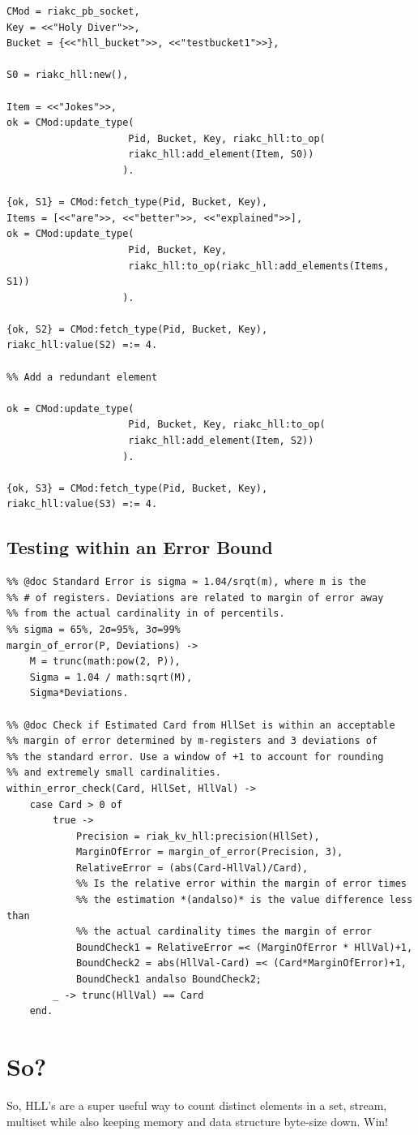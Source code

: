 \documentclass[12pt]{article}
\begin{document}
\begin{lstlisting}
CMod = riakc_pb_socket,
Key = <<"Holy Diver">>,
Bucket = {<<"hll_bucket">>, <<"testbucket1">>},

S0 = riakc_hll:new(),

Item = <<"Jokes">>,
ok = CMod:update_type(
                     Pid, Bucket, Key, riakc_hll:to_op(
                     riakc_hll:add_element(Item, S0))
                    ).

{ok, S1} = CMod:fetch_type(Pid, Bucket, Key),
Items = [<<"are">>, <<"better">>, <<"explained">>],
ok = CMod:update_type(
                     Pid, Bucket, Key,
                     riakc_hll:to_op(riakc_hll:add_elements(Items, S1))
                    ).

{ok, S2} = CMod:fetch_type(Pid, Bucket, Key),
riakc_hll:value(S2) =:= 4.

%% Add a redundant element

ok = CMod:update_type(
                     Pid, Bucket, Key, riakc_hll:to_op(
                     riakc_hll:add_element(Item, S2))
                    ).

{ok, S3} = CMod:fetch_type(Pid, Bucket, Key),
riakc_hll:value(S3) =:= 4.
\end{lstlisting}

\subsection{Testing within an Error Bound}

\begin{lstlisting}
%% @doc Standard Error is sigma ≈ 1.04/srqt(m), where m is the
%% # of registers. Deviations are related to margin of error away
%% from the actual cardinality in of percentils.
%% sigma = 65%, 2σ=95%, 3σ=99%
margin_of_error(P, Deviations) ->
    M = trunc(math:pow(2, P)),
    Sigma = 1.04 / math:sqrt(M),
    Sigma*Deviations.

%% @doc Check if Estimated Card from HllSet is within an acceptable
%% margin of error determined by m-registers and 3 deviations of
%% the standard error. Use a window of +1 to account for rounding
%% and extremely small cardinalities.
within_error_check(Card, HllSet, HllVal) ->
    case Card > 0 of
        true ->
            Precision = riak_kv_hll:precision(HllSet),
            MarginOfError = margin_of_error(Precision, 3),
            RelativeError = (abs(Card-HllVal)/Card),
            %% Is the relative error within the margin of error times
            %% the estimation *(andalso)* is the value difference less than
            %% the actual cardinality times the margin of error
            BoundCheck1 = RelativeError =< (MarginOfError * HllVal)+1,
            BoundCheck2 = abs(HllVal-Card) =< (Card*MarginOfError)+1,
            BoundCheck1 andalso BoundCheck2;
        _ -> trunc(HllVal) == Card
    end.
\end{lstlisting}

\section{So?}

So, HLL's are a super useful way to count distinct elements in a set, stream,
multiset while also keeping memory and data structure byte-size down. Win!

\printbibliography
\end{document}
